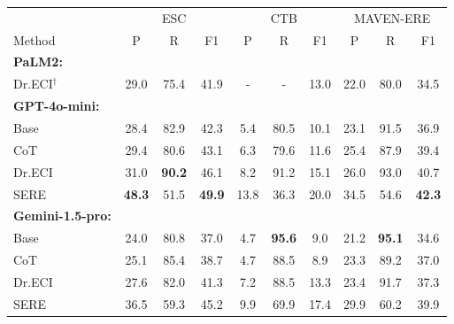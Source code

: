 \documentclass[11pt]{article}
\begin{document}
\begin{table}
\begin{tabular}{l ccc|ccc|ccc}
\toprule
 & \multicolumn{3}{c|}{ESC} & \multicolumn{3}{c|}{CTB} & \multicolumn{3}{c}{MAVEN-ERE} \\
Method & P & R & F1 & P & R & F1 & P & R & F1 \\
\midrule
\textbf{PaLM2:} & & & & & & & & & \\
\quad Dr.ECI$^\dagger$ & 29.0 & 75.4 & 41.9 & - & - & 13.0 & 22.0 & 80.0 & 34.5 \\
\midrule
\textbf{GPT-4o-mini:} & & & & & & & & & \\
\quad Base          & 28.4 & 82.9 & 42.3 & 5.4  & 80.5 & 10.1 & 23.1 & 91.5 & 36.9 \\
\quad CoT           & 29.4 & 80.6 & 43.1 & 6.3  & 79.6 & 11.6 & 25.4 & 87.9 & 39.4 \\
\quad Dr.ECI        & 31.0 & \textbf{90.2} & 46.1 & 8.2  & 91.2 & 15.1 & 26.0 & 93.0 & 40.7 \\
\quad SERE          & \textbf{48.3} & 51.5 & \textbf{49.9} & 13.8 & 36.3 & 20.0 & 34.5 & 54.6 & \textbf{42.3} \\
\midrule
\textbf{Gemini-1.5-pro:} & & & & & & & & & \\
\quad Base          & 24.0 & 80.8 & 37.0 & 4.7  & \textbf{95.6} & 9.0  & 21.2 & \textbf{95.1} & 34.6 \\
\quad CoT           & 25.1 & 85.4 & 38.7 & 4.7  & 88.5 & 8.9  & 23.3 & 89.2 & 37.0 \\
\quad Dr.ECI        & 27.6 & 82.0 & 41.3 & 7.2  & 88.5 & 13.3 & 23.4 & 91.7 & 37.3 \\
\quad SERE          & 36.5 & 59.3 & 45.2 & 9.9  & 69.9 & 17.4 & 29.9 & 60.2 & 39.9 \\

\end{tabular}
\end{table}
\end{document}
